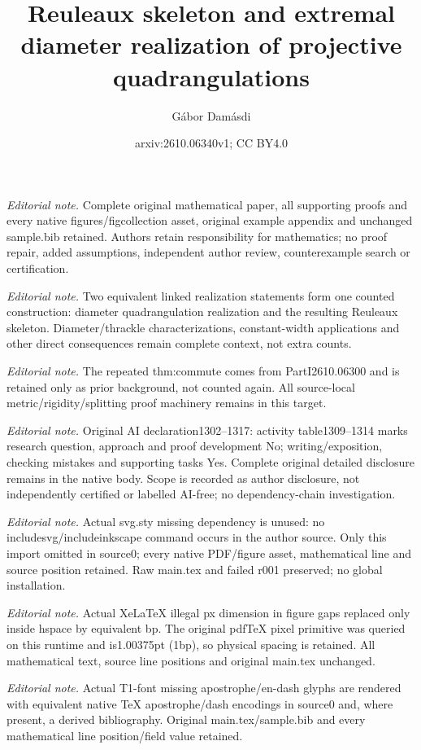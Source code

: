 \documentclass[10pt,a4paper]{article}
\title{Reuleaux skeleton and extremal diameter realization of projective quadrangulations}
\author{Gábor Damásdi}
\date{arxiv:2610.06340v1; CC BY4.0}
\newcounter{example}
\begin{document}
\maketitle
\noindent\textit{Editorial note.} Complete original mathematical paper, all supporting proofs and every native figures/figcollection asset, original example appendix and unchanged sample.bib retained. Authors retain responsibility for mathematics; no proof repair, added assumptions, independent author review, counterexample search or certification.\par\medskip
\noindent\textit{Editorial note.} Two equivalent linked realization statements form one counted construction: diameter quadrangulation realization and the resulting Reuleaux skeleton. Diameter/thrackle characterizations, constant-width applications and other direct consequences remain complete context, not extra counts.\par\medskip
\noindent\textit{Editorial note.} The repeated thm:commute comes from PartI2610.06300 and is retained only as prior background, not counted again. All source-local metric/rigidity/splitting proof machinery remains in this target.\par\medskip
\noindent\textit{Editorial note.} Original AI declaration1302--1317: activity table1309--1314 marks research question, approach and proof development No; writing/exposition, checking mistakes and supporting tasks Yes. Complete original detailed disclosure remains in the native body. Scope is recorded as author disclosure, not independently certified or labelled AI-free; no dependency-chain investigation.\par\medskip
\noindent\textit{Editorial note.} Actual svg.sty missing dependency is unused: no includesvg/includeinkscape command occurs in the author source. Only this import omitted in source0; every native PDF/figure asset, mathematical line and source position retained. Raw main.tex and failed r001 preserved; no global installation.\par\medskip
\noindent\textit{Editorial note.} Actual XeLaTeX illegal px dimension in figure gaps replaced only inside hspace by equivalent bp. The original pdfTeX pixel primitive was queried on this runtime and is1.00375pt (1bp), so physical spacing is retained. All mathematical text, source line positions and original main.tex unchanged.\par\medskip
\noindent\textit{Editorial note.} Actual T1-font missing apostrophe/en-dash glyphs are rendered with equivalent native TeX apostrophe/dash encodings in source0 and, where present, a derived bibliography. Original main.tex/sample.bib and every mathematical line position/field value retained.\par\medskip
\end{document}
